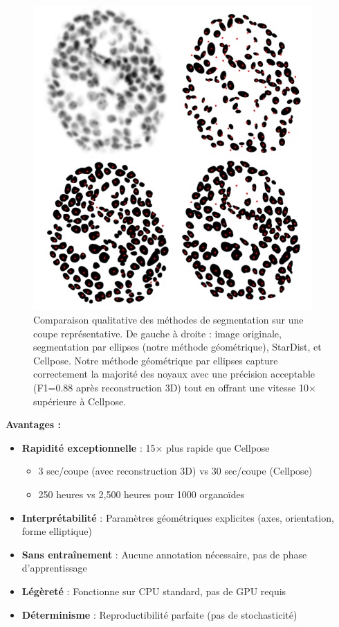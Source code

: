 \begin{figure}[htbp]
    \centering
    \includegraphics[width=0.95\textwidth]{../img/Comp.png}
    \caption{Comparaison qualitative des méthodes de segmentation sur une coupe représentative. De gauche à droite : image originale, segmentation par ellipses (notre méthode géométrique), StarDist, et Cellpose. Notre méthode géométrique par ellipses capture correctement la majorité des noyaux avec une précision acceptable (F1=0.88 après reconstruction 3D) tout en offrant une vitesse 10× supérieure à Cellpose.}
    \label{fig:comp}
\end{figure}

\textbf{Avantages :}
\begin{itemize}
    \item \textbf{Rapidité exceptionnelle} : 15× plus rapide que Cellpose
    \begin{itemize}
        \item 3 sec/coupe (avec reconstruction 3D) vs 30 sec/coupe (Cellpose)
        \item 250 heures vs 2,500 heures pour 1000 organoïdes
    \end{itemize}
    \item \textbf{Interprétabilité} : Paramètres géométriques explicites (axes, orientation, forme elliptique)
    \item \textbf{Sans entraînement} : Aucune annotation nécessaire, pas de phase d'apprentissage
    \item \textbf{Légèreté} : Fonctionne sur CPU standard, pas de GPU requis
    \item \textbf{Déterminisme} : Reproductibilité parfaite (pas de stochasticité)
\end{itemize}

